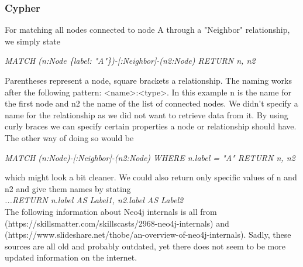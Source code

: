 \subsubsection{Cypher}
For matching all nodes connected to node A through a "Neighbor" relationship, we simply state
\begin{exmp}
\label{ex231}
\emph{MATCH (n:Node \{label: "A"\})-[:Neighbor]-(n2:Node) RETURN n, n2 }
\end{exmp}
Parentheses represent a node, square brackets a relationship. The naming works after the following pattern: <name>:<type>. In this example n is the name for the first node and n2 the name of the list of connected nodes. We didn't specify a name for the relationship as we did not want to retrieve data from it. By using curly braces we can specify certain properties a node or relationship should have. The other way of doing so would be 
\begin{exmp}
\label{ex232}
\emph{MATCH (n:Node)-[:Neighbor]-(n2:Node) WHERE n.label = "A" RETURN n, n2 }
\end{exmp}
which might look a bit cleaner. We could also return only specific values of n and n2 and give them names by stating \\
\emph{ ...RETURN n.label AS Label1, n2.label AS Label2 }\\
The following information about Neo4j internals is all from (https://skillsmatter.com/skillscasts/2968-neo4j-internals) and (https://www.slideshare.net/thobe/an-overview-of-neo4j-internals). Sadly, these sources are all old and probably outdated, yet there does not seem to be more updated information on the internet.
